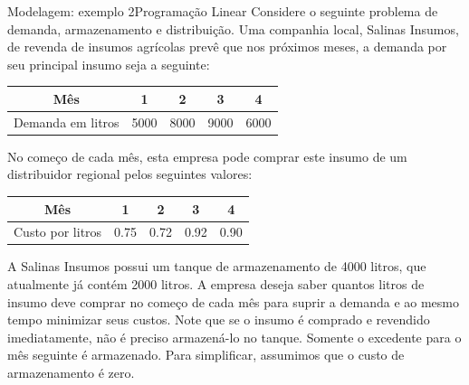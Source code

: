 \documentclass[t]{beamer}
\begin{document}
\begin{ftst}{Modelagem: exemplo 2}{Programação Linear}
\footnotesize
Considere o seguinte problema de demanda, armazenamento e distribuição. Uma companhia local, Salinas Insumos, de revenda de insumos agrícolas prevê que nos próximos meses, a demanda por seu principal insumo seja a seguinte:

\begin{table}[]
\centering
\footnotesize
\begin{tabular}{|c|c|c|c|c|}
\hline
Mês               & 1    & 2    & 3    & 4    \\ \hline
Demanda em litros & 5000 & 8000 & 9000 & 6000 \\ \hline
\end{tabular}
\end{table}

No começo de cada mês, esta empresa pode comprar este insumo de um distribuidor regional pelos seguintes valores:

\begin{table}[]
\centering
\footnotesize
\begin{tabular}{|c|c|c|c|c|}
\hline
Mês              & 1    & 2    & 3    & 4    \\ \hline
Custo por litros & 0.75 & 0.72 & 0.92 & 0.90 \\ \hline
\end{tabular}
\end{table}

A Salinas Insumos possui um tanque de armazenamento de 4000 litros, que atualmente já contém 2000 litros. A empresa deseja saber quantos litros de insumo deve comprar no começo de cada mês para suprir a demanda e ao mesmo tempo minimizar seus custos. Note que se o insumo é comprado e revendido imediatamente, não é preciso armazená-lo no tanque. Somente o excedente para o mês seguinte é armazenado. Para simplificar, assumimos que o custo de armazenamento é zero. 
\end{ftst}


\end{document}
